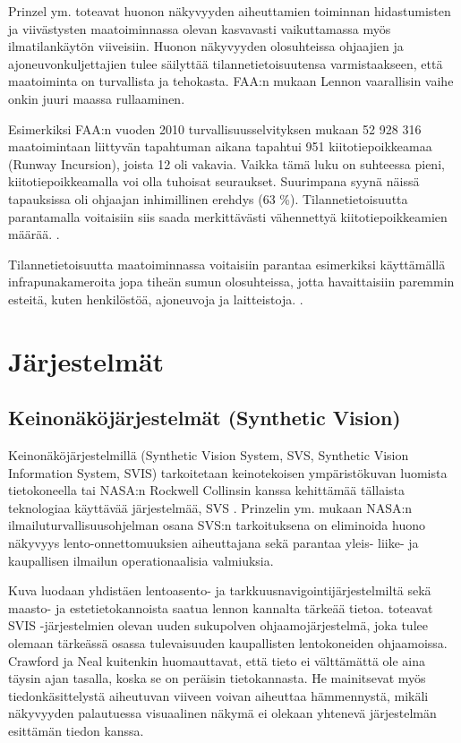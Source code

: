 \documentclass[utf8,bachelor,manualbib]{gradu3}
\begin{document}
Prinzel ym. \citeyearpar{prinzel2013} toteavat huonon näkyvyyden aiheuttamien toiminnan hidastumisten ja viivästysten maatoiminnassa olevan kasvavasti vaikuttamassa myös ilmatilankäytön viiveisiin. Huonon näkyvyyden olosuhteissa ohjaajien ja ajoneuvonkuljettajien tulee säilyttää tilannetietoisuutensa varmistaakseen, että maatoiminta on turvallista ja tehokasta. FAA:n mukaan \citeyearpar{gerold2001} Lennon vaarallisin vaihe onkin juuri maassa rullaaminen.

Esimerkiksi FAA:n vuoden 2010 turvallisuusselvityksen mukaan 52 928 316 maatoimintaan liittyvän tapahtuman aikana tapahtui 951 kiitotiepoikkeamaa (Runway Incursion), joista 12 oli vakavia. Vaikka tämä luku on suhteessa pieni, kiitotiepoikkeamalla voi olla tuhoisat seuraukset. Suurimpana syynä näissä tapauksissa oli ohjaajan inhimillinen erehdys (63 \%). Tilannetietoisuutta parantamalla voitaisiin siis saada merkittävästi vähennettyä kiitotiepoikkeamien määrää. \citep{prinzel2013}.

Tilannetietoisuutta maatoiminnassa voitaisiin parantaa esimerkiksi käyttämällä infrapunakameroita jopa tiheän sumun olosuhteissa, jotta havaittaisiin paremmin esteitä, kuten henkilöstöä, ajoneuvoja ja laitteistoja. \citep{beiergemperlein2004}.

\chapter{Järjestelmät}

\section{Keinonäköjärjestelmät (Synthetic Vision)}

Keinonäköjärjestelmillä (Synthetic Vision System, SVS, Synthetic Vision Information System, SVIS) tarkoitetaan keinotekoisen ympäristökuvan luomista  tietokoneella \citep{baileyym2007} tai NASA:n Rockwell Collinsin kanssa kehittämää tällaista teknologiaa käyttävää järjestelmää, SVS \citep{crawfordneal2006}. Prinzelin ym. \citeyearpar{prinzel2004} mukaan NASA:n ilmailuturvallisuusohjelman osana SVS:n tarkoituksena on eliminoida huono näkyvyys lento-onnettomuuksien aiheuttajana sekä parantaa yleis- liike- ja kaupallisen ilmailun operationaalisia valmiuksia.

Kuva luodaan yhdistäen lentoasento- ja tarkkuusnavigointijärjestelmiltä sekä maasto- ja estetietokannoista saatua lennon kannalta tärkeää tietoa. \cite{schnellym2004} toteavat SVIS -järjestelmien olevan uuden sukupolven ohjaamojärjestelmä, joka tulee olemaan tärkeässä osassa tulevaisuuden kaupallisten lentokoneiden ohjaamoissa. Crawford ja Neal kuitenkin \citeyearpar{crawfordneal2006} huomauttavat, että tieto ei välttämättä ole aina täysin ajan tasalla, koska se on peräisin tietokannasta. He mainitsevat myös tiedonkäsittelystä aiheutuvan viiveen voivan aiheuttaa hämmennystä, mikäli näkyvyyden palautuessa visuaalinen näkymä ei olekaan yhtenevä järjestelmän esittämän tiedon kanssa.
\end{document}
